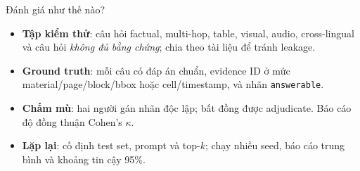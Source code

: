 \documentclass[aspectratio=169,11pt]{beamer}
\begin{document}
\begin{frame}{Đánh giá như thế nào?}
\small
\begin{center}
\end{center}
\vspace{0.15cm}
\begin{itemize}
  \item \textbf{Tập kiểm thử}: câu hỏi factual, multi-hop, table, visual, audio, cross-lingual và câu hỏi \textit{không đủ bằng chứng}; chia theo tài liệu để tránh leakage.
  \item \textbf{Ground truth}: mỗi câu có đáp án chuẩn, evidence ID ở mức material/page/block/bbox hoặc cell/timestamp, và nhãn \texttt{answerable}.
  \item \textbf{Chấm mù}: hai người gán nhãn độc lập; bất đồng được adjudicate. Báo cáo độ đồng thuận Cohen's $\kappa$.
  \item \textbf{Lặp lại}: cố định test set, prompt và top-$k$; chạy nhiều seed, báo cáo trung bình và khoảng tin cậy 95\%.
\end{itemize}
\end{frame}
\end{document}
